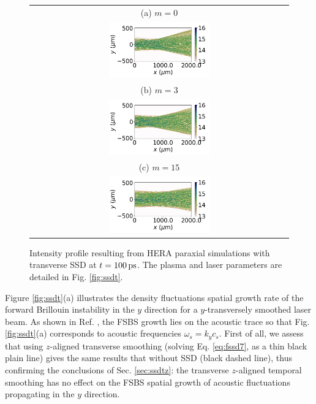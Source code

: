 \documentclass[
 reprint,
 amsmath,amssymb,
 aps,
]{revtex4-1}
\begin{document}
\begin{figure}
\begin{tabular}{c}
(a) $m=0$\\
\includegraphics[width=0.4\textwidth,trim={2cm 0 0 0},clip]{ISSD0.png}\\
(b)  $m=3$\\
\includegraphics[width=0.4\textwidth,trim={2cm 0 0 0},clip]{ISSD1.png}\\
(c) $m=15$\\
\includegraphics[width=0.4\textwidth,trim={2cm 0 0 0},clip]{ISSD5.png}
\end{tabular}
\caption{ \label{fig:ssdt_I} 
  Intensity profile resulting from HERA paraxial simulations with transverse SSD at $t=100\,\rm ps$. The plasma and laser parameters are detailed in Fig. \ref{fig:ssdt}.
}
\end{figure}
Figure \ref{fig:ssdt}(a) illustrates the density fluctuations spatial growth rate of the forward Brillouin instability in the $y$ direction  for a $y$-transversely smoothed laser beam. As shown in Ref. \cite[]{Ruyer_FSBS}, the FSBS growth lies on the acoustic trace so that Fig.  \ref{fig:ssdt}(a) corresponds to acoustic frequencies $\omega_s=k_yc_s$.   First of all, we assess that using $z$-aligned transverse smoothing (solving Eq. \eqref{eq:fssd7}, as a thin black plain line) gives the same results that without SSD (black dashed line), thus confirming the conclusions of Sec. \ref{sec:ssdtz}: the transverse $z$-aligned temporal smoothing has no effect on the  FSBS spatial growth of acoustic fluctuations propagating in the $y$ direction. 
\end{document}
